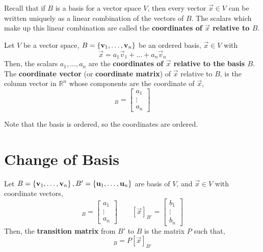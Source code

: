 \documentclass[letterpaper,12pt]{article}
\begin{document}
Recall that if $B$ is a basis for a vector space $V$, then every vector $\vec{x} \in V$ can be written uniquely as a linear combination of the vectors of $B$. The scalars which make up this linear combination are called the \textbf{coordinates of $\vec{x}$ relative to $B$}.

\begin{definition}
Let $V$ be a vector space, $B = \left\{ \mathbf{v}_1, \dots, \mathbf{v}_n \right\}$ be an ordered basis, $\vec{x} \in V$ with
\begin{equation*}
    \vec{x} = a_1 \vec{v}_1 + \dots + a_n \vec{v}_n
\end{equation*}
Then, the scalars $a_1, \dots, a_n$ are the \textbf{coordinates of $\vec{x}$ relative to the basis $B$}. The \textbf{coordinate vector} (or \textbf{coordinate matrix}) of $\vec{x}$ relative to $B$, is the column vector in $\mathbb{R}^n$ whose components are the coordinate of $\vec{x}$,
\begin{equation*}
    [\vec{x}]_B = \begin{bmatrix} a_1 \\ \vdots \\ a_n \end{bmatrix}
\end{equation*}
\end{definition}

Note that the basis is ordered, so the coordinates are ordered.

\section*{Change of Basis}

\begin{definition}
Let $B = \left\{ \mathbf{v}_1, \dots, \mathbf{v}_n \right\}, B' = \left\{ \mathbf{u}_1, \dots, \mathbf{u}_n \right\}$ are basis of $V$, and $\vec{x} \in V$ with coordinate vectors,
\begin{equation*}
    [\vec{x}]_B = \begin{bmatrix} a_1 \\ \vdots \\ a_n \end{bmatrix} \qquad [\vec{x}]_{B'} = \begin{bmatrix} b_1 \\ \vdots \\ b_n \end{bmatrix}
\end{equation*}
Then, the \textbf{transition matrix} from $B'$ to $B$ is the matrix $P$ such that,
\begin{equation*}
    [\vec{x}]_B = P [\vec{x}]_{B'}
\end{equation*}
\end{definition}
\end{document}
